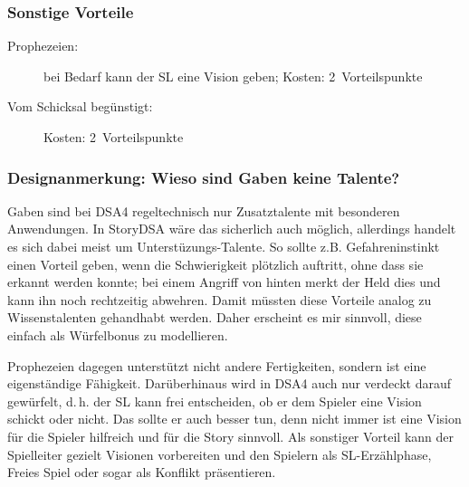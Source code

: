 \subsubsection{Sonstige Vorteile}
\begin{description}
  \item[Prophezeien:] bei Bedarf kann der SL eine Vision geben; Kosten: 2~Vorteilspunkte
  \item[Vom Schicksal begünstigt:] Kosten: 2~Vorteilspunkte
\end{description}
\begin{design}
\subsubsection{Designanmerkung: Wieso sind Gaben keine Talente?}
 Gaben sind bei DSA4 regeltechnisch nur Zusatztalente mit besonderen Anwendungen. In StoryDSA wäre das sicherlich auch möglich, allerdings handelt es sich dabei meist um Unterstüzungs-Talente. So sollte z.B. Gefahreninstinkt einen Vorteil geben, wenn die Schwierigkeit plötzlich auftritt, ohne dass sie erkannt werden konnte; bei einem Angriff von hinten merkt der Held dies und kann ihn noch rechtzeitig abwehren. Damit müssten diese Vorteile analog zu Wissenstalenten gehandhabt werden. Daher erscheint es mir sinnvoll, diese einfach als Würfelbonus zu modellieren.

Prophezeien dagegen unterstützt nicht andere Fertigkeiten, sondern ist eine eigenständige Fähigkeit. Darüberhinaus wird in DSA4 auch nur verdeckt darauf gewürfelt, d.\,h. der SL kann frei entscheiden, ob er dem Spieler eine Vision schickt oder nicht. Das sollte er auch besser tun, denn nicht immer ist eine Vision für die Spieler hilfreich und für die Story sinnvoll. Als sonstiger Vorteil kann der Spielleiter gezielt Visionen vorbereiten und den Spielern als SL-Erzählphase, Freies Spiel oder sogar als Konflikt präsentieren.
\end{design}

